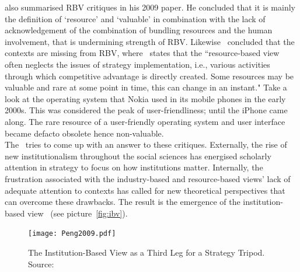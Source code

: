 \cite{Kraaijenbrink:2009} also summarised \gls{RBV} critiques in his 2009 paper. 
He concluded that it is mainly the definition of `resource' and `valuable' in combination with the lack of acknowledgement of the combination of bundling resources and the human involvement, that is undermining strength of \gls{RBV}.
Likewise~\cite{Priem:2001} concluded that the contexts are missing from \gls{RBV}, where~\cite{Dung:2012} states that the ``resource-based view often neglects the issues of strategy implementation, i.e., various activities through which competitive advantage is directly created. Some resources may be valuable and rare at some point in time, this can change in an instant." 
Take a look at the operating system that Nokia used in its mobile phones in the early 2000s. 
This was considered the peak of user-friendliness; until the iPhone came along. 
The rare resource of a user-friendly operating system and user interface became defacto obsolete hence non-valuable.\\

The \ibv~tries to come up with an answer to these critiques. 
Externally, the rise of new institutionalism throughout the social sciences has energised scholarly attention in strategy to focus on how institutions matter. Internally, the frustration associated with the industry-based and resource-based views’ lack of adequate attention to contexts has called for new theoretical perspectives that can overcome these drawbacks. 
The result is the emergence of the institution-based view~\cite{Peng:2009} (see picture~\ref{fig:ibv}).


\begin{figure}[htbp!] 
      \label{fig:ibv2}
	\centering
	\texttt{[image: Peng2009.pdf]}
 	\caption{The Institution-Based View as a Third Leg for a Strategy Tripod. Source:~\cite{Peng:2009}}
\end{figure}

